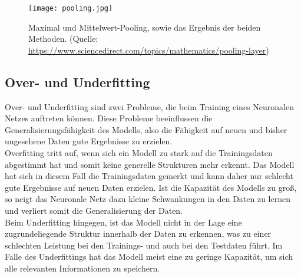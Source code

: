 \begin{figure}
	\centering
	\texttt{[image: pooling.jpg]}
	\caption{Maximal und Mittelwert-Pooling, sowie das Ergebnis der beiden Methoden. (Quelle: \url{https://www.sciencedirect.com/topics/mathematics/pooling-layer})}
	\label{fig:pooling}
\end{figure}


\subsection{Over- und Underfitting}
Over- und Underfitting sind zwei Probleme, die beim Training eines Neuronalen Netzes auftreten können. Diese Probleme beeinflussen die Generalisierungsfähigkeit des Modells, also die Fähigkeit auf neuen und bisher ungesehene Daten gute Ergebnisse zu erzielen.\\
Overfitting tritt auf, wenn sich ein Modell zu stark auf die Trainingsdaten abgestimmt hat und somit keine generelle Strukturen mehr erkennt. Das \gls{Modell} hat sich in diesem Fall die Trainingsdaten gemerkt und kann daher nur schlecht gute Ergebnisse auf neuen Daten erzielen. Ist die Kapazität des \gls{Modell}s zu groß, so neigt das Neuronale Netz dazu kleine Schwankungen in den Daten zu lernen und verliert somit die Generalisierung der Daten.\\
Beim Underfitting hingegen, ist das \gls{Modell} nicht in der Lage eine zugrundeliegende Struktur innerhalb der Daten zu erkennen, was zu einer schlechten Leistung bei den Trainings- und auch bei den Testdaten führt. Im Falle des Underfittings hat das \gls{Modell} meist eine zu geringe Kapazität, um sich alle relevanten Informationen zu speichern.\cite[vgl.][]{Goodfellow2016}